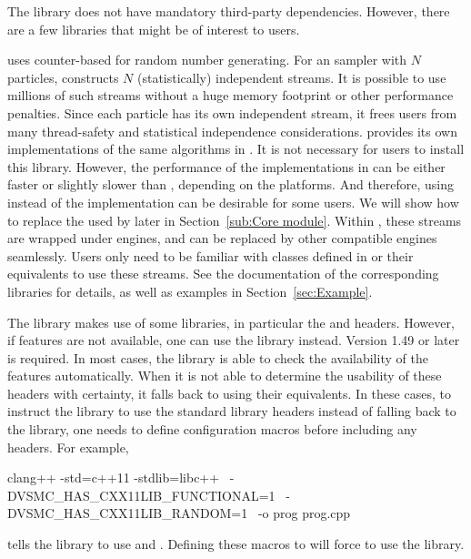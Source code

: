 \documentclass[11pt, fontset=Minion, showoverfull,
bib, mintcode, minted=cache]{marticle}
\begin{document}
The library does not have mandatory third-party dependencies. However, there
are a few libraries that might be of interest to users.

\vsmc uses \frandom \parencite{random} counter-based \rng for random number
generating. For an \smc sampler with $N$ particles, \vsmc constructs $N$
(statistically) independent \rng streams. It is possible to use millions of
such streams without a huge memory footprint or other performance penalties.
Since each particle has its own independent \rng stream, it frees users from
many thread-safety and statistical independence considerations. \vsmc provides
its own implementations of the same algorithms in \lrandom. It is not necessary
for users to install this library. However, the performance of the
implementations in \vsmc can be either faster or slightly slower than \lrandom,
depending on the platforms. And therefore, using \lrandom instead of the \vsmc
implementation can be desirable for some users. We will show how to replace
the \rng used by \vsmc later in Section~\ref{sub:Core module}. Within \vsmc,
these \rng streams are wrapped under \cppoo \rng engines, and can be replaced
by other compatible \rng engines seamlessly. Users only need to be familiar
with classes defined in \cppoo {} or their \fboost
equivalents to use these \rng streams. See the documentation of the
corresponding libraries for details, as well as examples in
Section~\ref{sec:Example}.

The library makes use of some \cppoo libraries, in particular the
 and  headers. However, if \cppoo
features are not available, one can use the \lboost library instead. Version
1.49 or later is required. In most cases, the library is able to check the
availability of the \cppoo features automatically. When it is not able to
determine the usability of these \cppoo headers with certainty, it falls back
to using their \lboost equivalents. In these cases, to instruct the library to
use the standard library headers instead of falling back to the \lboost
library, one needs to define configuration macros before including any \vsmc
headers. For example,
\begin{shcode}
clang++ -std=c++11 -stdlib=libc++        \
        -DVSMC_HAS_CXX11LIB_FUNCTIONAL=1 \
        -DVSMC_HAS_CXX11LIB_RANDOM=1     \
        -o prog prog.cpp
\end{shcode}
tells the library to use \cppoo {} and
\cppinline{<random>}. Defining these macros to  will force \vsmc
to use the \lboost library.
\end{document}
